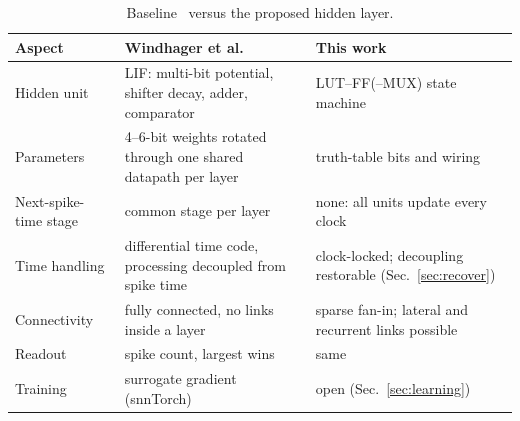\begin{table}[t]
\centering
\caption{Baseline~\cite{windhager2024} versus the proposed hidden layer.}
\label{tab:compare}
\small
\begin{tabular}{@{}p{3.1cm}p{5.7cm}p{5.7cm}@{}}
\toprule
Aspect & Windhager et al. & This work\\
\midrule
Hidden unit & LIF: multi-bit potential, shifter decay, adder, comparator & LUT--FF(--MUX) state machine\\
Parameters & 4--6-bit weights rotated through one shared datapath per layer & truth-table bits and wiring\\
Next-spike-time stage & common stage per layer & none: all units update every clock\\
Time handling & differential time code, processing decoupled from spike time & clock-locked; decoupling restorable (Sec.~\ref{sec:recover})\\
Connectivity & fully connected, no links inside a layer & sparse fan-in; lateral and recurrent links possible\\
Readout & spike count, largest wins & same\\
Training & surrogate gradient (snnTorch) & open (Sec.~\ref{sec:learning})\\
\bottomrule
\end{tabular}
\end{table}

\FloatBarrier
